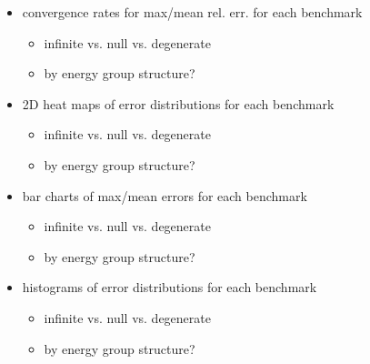 \begin{itemize}[noitemsep]
  \item convergence rates for max/mean rel. err. for each benchmark
  \begin{itemize}[noitemsep]
    \item infinite vs. null vs. degenerate
    \item by energy group structure?
  \end{itemize}
  \item 2D heat maps of error distributions for each benchmark
  \begin{itemize}[noitemsep]
    \item infinite vs. null vs. degenerate
    \item by energy group structure?
  \end{itemize}
  \item bar charts of max/mean errors for each benchmark
  \begin{itemize}[noitemsep]
    \item infinite vs. null vs. degenerate
    \item by energy group structure?
  \end{itemize}
  \item histograms of error distributions for each benchmark
  \begin{itemize}[noitemsep]
    \item infinite vs. null vs. degenerate
    \item by energy group structure?
  \end{itemize}
\end{itemize}

